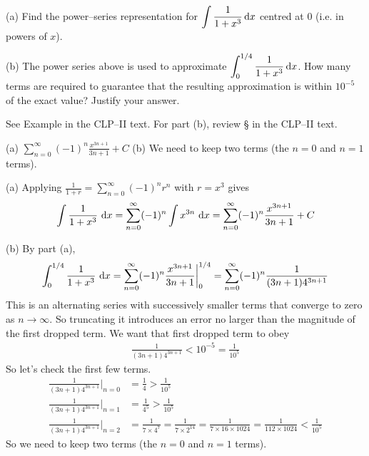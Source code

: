 \begin{Mquestion}[2013A]
 (a)  Find the power--series representation for
$\displaystyle\int\frac{1}{1+x^3}\,\mathrm{d}x$ centred at $0$ (i.e. in powers of
$x$).

\noindent (b) The power series above is used to approximate
$\displaystyle\int_0^{1/4}\frac{1}{1+x^3}\,\mathrm{d}x$. How many terms are
required to guarantee that the resulting approximation is within
$10^{-5}$ of the exact value? Justify your answer.
\end{Mquestion}

\begin{hint}
See Example  in the
CLP--II text.
For part (b), review  \S {} in the
CLP--II text.
\end{hint}

\begin{answer}
(a)
$\displaystyle\sum\limits_{n=0}^\infty(-1)^n \frac{x^{3n+1}}{3n+1} +C$
\quad (b)
We need to keep two terms (the $n=0$ and $n=1$ terms).
\end{answer}

\begin{solution} (a)
Applying $\displaystyle\frac{1}{1+r}=\sum\limits_{n=0}^\infty (-1)^nr^n$ with $r=x^3$
gives
\begin{align*}
\int\frac{1}{1+x^3}\ \dee{x} =\sum_{n=0}^\infty(-1)^n \int x^{3n}\ \dee{x}
=\sum_{n=0}^\infty(-1)^n \frac{x^{3n+1}}{3n+1} +C
\end{align*}


\noindent (b) By part (a),
\begin{align*}
\int_0^{1/4}\frac{1}{1+x^3}\ \mathrm{d}x
=\sum_{n=0}^\infty(-1)^n \frac{x^{3n+1}}{3n+1} \bigg|_0^{1/4}
=\sum_{n=0}^\infty(-1)^n \frac{1}{(3n+1)4^{3n+1}}
\end{align*}
This is an alternating series with successively smaller terms that converge
to zero as $n\rightarrow\infty$. So truncating
it introduces an error no larger than the magnitude of the first dropped
term. We want that first dropped term to obey
\begin{align*}
\frac{1}{(3n+1)4^{3n+1}}<10^{-5}=\frac{1}{10^5}
\end{align*}
So let's check the first few terms.
\begin{align*}
\frac{1}{(3n+1)4^{3n+1}}\bigg|_{n=0}&=\frac{1}{4}>\frac{1}{10^5}\\
\frac{1}{(3n+1)4^{3n+1}}\bigg|_{n=1}&=\frac{1}{4^5}>\frac{1}{10^5}\\
\frac{1}{(3n+1)4^{3n+1}}\bigg|_{n=2}&=\frac{1}{7\times 4^7}
                         =\frac{1}{7\times 2^{14}}
                         =\frac{1}{7\times16\times 1024}
                         =\frac{1}{112\times 1024}<\frac{1}{10^5}
\end{align*}
So we need to keep two terms (the $n=0$ and $n=1$ terms).

\end{solution}


